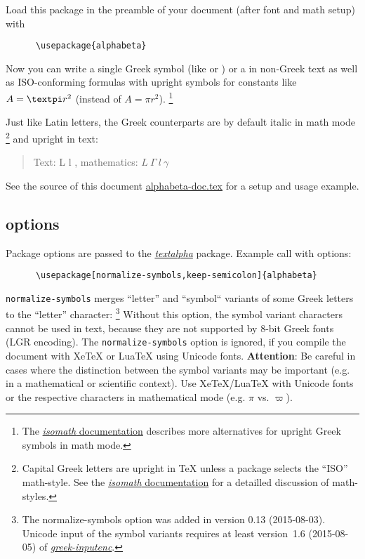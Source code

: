 \documentclass{article}
\begin{document}
Load this package in the preamble of your document (after font and math
setup) with
\begin{verbatim}
      \usepackage{alphabeta}
\end{verbatim}
%
Now you can write a single Greek symbol (like \Psi{} or \mu{}) or
a \lambda\omicron\gamma\omicron\varsigma{} in non-Greek text as well as
ISO-conforming formulas with upright symbols for constants
like $A = \text{\pi} r^2$ (instead of $A = \pi r^2$).%
\footnote{The
  \href{http://mirrors.ctan.org/macros/latex/contrib/isomath/isomath.html}%
  {\emph{isomath} documentation} describes more alternatives for upright
  Greek symbols in math mode.}

Just like Latin letters, the Greek counterparts are by default italic in
math mode%
\footnote{Capital Greek letters are upright in TeX unless a package selects
the ``ISO'' math-style. See the
\href{http://mirrors.ctan.org/macros/latex/contrib/isomath/isomath.html}%
{\emph{isomath} documentation} for a detailled discussion of math-styles.}
and upright in text:

\begin{quote}
  Text: L \Gamma{} l \gamma,
  mathematics: $ L \ \Gamma \ l \ \gamma $
\end{quote}
%
See the source of this document \url{alphabeta-doc.tex} for a setup and
usage example.


\subsection{options}

Package options are passed to the \href{textalpha-doc.pdf}{\emph{textalpha}}
package. Example call with options:

\begin{verbatim}
      \usepackage[normalize-symbols,keep-semicolon]{alphabeta}
\end{verbatim}

\texttt{normalize-symbols} merges ``letter'' and ``symbol`` variants of
some Greek letters to the ``letter'' character:
\footnote{The normalize-symbols option was added in version 0.13 (2015-08-03).
  Unicode input of the symbol variants requires at least version~1.6
  (2015-08-05) of
  \emph{\href{http://www.ctan.org/pkg/greek-inputenc}{greek-inputenc}}.}
Without this option, the symbol variant characters cannot be used in text,
because they are not supported by 8-bit Greek fonts (LGR encoding).
The \texttt{normalize-symbols} option is ignored, if you compile the
document with XeTeX or LuaTeX using Unicode fonts.
\textbf{Attention}: Be careful in cases where the distinction between the
symbol variants may be important (e.g. in a mathematical or scientific
context). Use XeTeX/LuaTeX with Unicode fonts or the respective characters
in mathematical mode (e.g. $\pi$ vs. $\varpi$).
\end{document}
